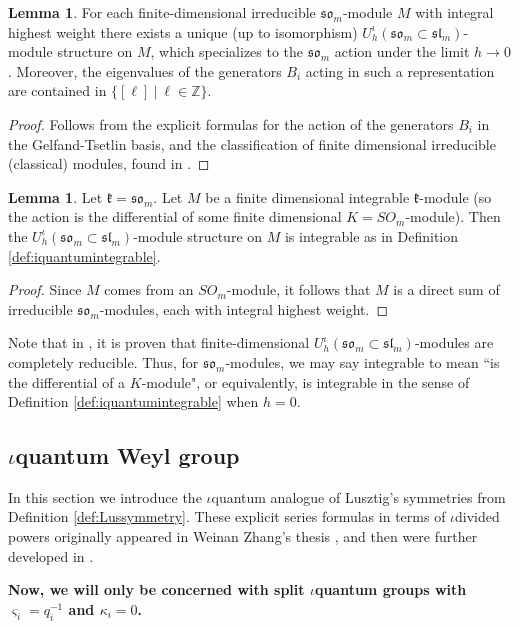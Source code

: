 \documentclass[10pt]{amsart}
\numberwithin{equation}{section}
\theoremstyle{definition}
\newtheorem{lemma}[theorem]{Lemma}
\newcommand{\slm}{\mathfrak{sl}_{m}}
\newcommand{\som}[1][m]{\mathfrak{so}_{#1}}
\newcommand{\kompact}{\mathfrak{k}}
\begin{document}
\begin{lemma}\label{lem:deformiquantummodule}
    For each finite-dimensional irreducible $\som$-module $M$ with integral highest weight there exists a unique (up to isomorphism) $U^{\iota}_h(\som \subset \slm)$-module structure on $M$, which specializes to the $\som$ action under the limit $h\rightarrow 0$. Moreover, the eigenvalues of the generators $B_i$ acting in such a representation are contained in $\{[\ell] \ | \ \ell \in \mathbb{Z}\}$.
\end{lemma}
\begin{proof}
    Follows from the explicit formulas for the action of the generators $B_i$ in the Gelfand-Tsetlin basis, and the classification of finite dimensional irreducible (classical) modules, found in \cite{MR2143754}.
\end{proof}

\begin{lemma}
    Let $\kompact = \som$. Let $M$ be a finite dimensional integrable $\kompact$-module (so the action is the differential of some finite dimensional $K=SO_m$-module). Then the $U_h^{\iota}(\som\subset \slm)$-module structure on $M$ is integrable as in Definition \ref{def:iquantumintegrable}.
\end{lemma}

\begin{proof}
    Since $M$ comes from an $SO_m$-module, it follows that $M$ is a direct sum of irreducible $\som$-modules, each  with integral highest weight. 
\end{proof}

    Note that in \cite{MR2143754}, it is proven that finite-dimensional $U_h^{\iota}(\som\subset \slm)$-modules are completely reducible. Thus, for $\som$-modules, we may say integrable to mean ``is the differential of a $K$-module", or equivalently, is integrable in the sense of Definition \ref{def:iquantumintegrable} when $h=0$.

\subsection{$\iota$quantum Weyl group} In this section we introduce the $\iota$quantum analogue of Lusztig's symmetries from Definition \ref{def:Lussymmetry}. These explicit series formulas in terms of $\iota$divided powers originally appeared in Weinan Zhang's thesis \cite{zhang-thesis}, and then were further developed in \cite{WW25}.
    
\textbf{Now, we will only be concerned with split $\iota$quantum groups with $\varsigma_i=q_i^{-1}$ and $\kappa_i=0$.} 
\end{document}

